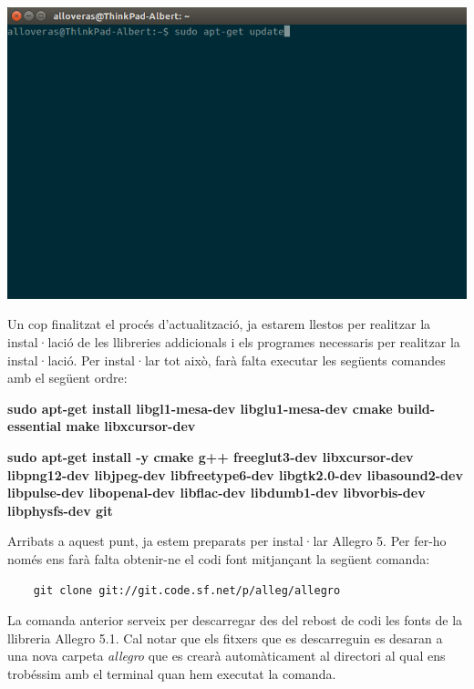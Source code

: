 \documentclass[11pt]{article}
\begin{document}
\begin{center}
	\includegraphics[scale=0.4]{img/Apt_Get_Update.png}
\end{center}

\noindent Un cop finalitzat el procés d'actualització, ja estarem llestos per realitzar la instal·lació de  les llibreries addicionals i els programes necessaris per realitzar la instal·lació. Per instal·lar tot això, farà falta executar les següents comandes amb el següent ordre:

\begin{center}
	\textbf{sudo apt-get install libgl1-mesa-dev libglu1-mesa-dev cmake build-essential make libxcursor-dev}
\end{center}

\begin{center}
	\textbf{sudo apt-get install -y cmake g++ freeglut3-dev libxcursor-dev libpng12-dev libjpeg-dev libfreetype6-dev libgtk2.0-dev libasound2-dev libpulse-dev libopenal-dev libflac-dev libdumb1-dev libvorbis-dev libphysfs-dev git}
\end{center}

\pagebreak
\noindent Arribats a aquest punt, ja estem preparats per instal·lar Allegro 5. Per fer-ho només ens farà falta obtenir-ne el codi font mitjançant la següent comanda:
\begin{verbatim}
	git clone git://git.code.sf.net/p/alleg/allegro
\end{verbatim}

\noindent La comanda anterior serveix per descarregar des del rebost de codi les fonts de la llibreria Allegro 5.1. Cal notar que els fitxers que es descarreguin es desaran a una nova carpeta \textit{allegro} que es crearà automàticament al directori al qual ens trobéssim amb el terminal quan hem executat la comanda.
\end{document}

